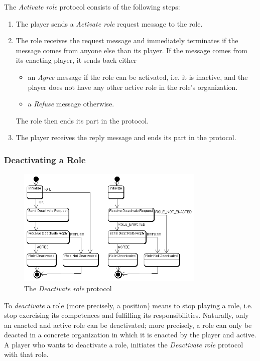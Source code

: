 The \textit{Activate role} protocol consists of the following steps:
\begin{enumerate}
	\item The player sends a \textit{Activate role} request message to the role.
	\item The role receives the request message and immediately terminates if the message comes from anyone else than its player.
	If the message comes from its enacting player, it sends back either
	\begin{itemize}
		\item an \textit{Agree} message if the role can be activated, i.e. it is inactive, and the player does not have any other active role in the role's organization.
		\item a \textit{Refuse} message otherwise. 
	\end{itemize}
	The role then ends its part in the protocol.
	\item The player receives the reply message and ends its part in the protocol.
\end{enumerate}

\subsubsection{Deactivating a Role}

\begin{figure}[ht]
	\centering
	\includegraphics[width=0.8\textwidth]{images/thespian/deactivate-role-protocol.png}
	\caption{The \textit{Deactivate role} protocol}
	\label{figure:thespian-deactivate-role-protocol}
\end{figure}

To \textit{deactivate} a role (more precisely, a position) means to stop playing a role, i.e. stop exercising its competences and fulfilling its responsibilities.
Naturally, only an enacted and active role can be deactivated; more precisely, a role can only be deacted in a concrete organization in which it is enacted by the player and active.
A player who wants to deactivate a role, initiates the \textit{Deactivate role} protocol with that role.

